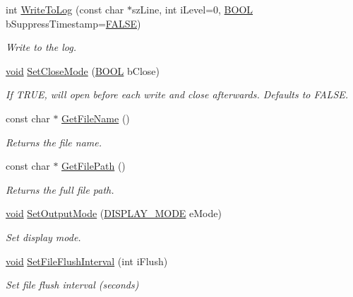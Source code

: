 \begin{DoxyCompactItemize}
int \hyperlink{class_c_logging_aba3316d82e49f6a3d60af0bac38602c2}{\-Write\-To\-Log} (const char $\ast$sz\-Line, int i\-Level=0, \hyperlink{_cpclient_8h_a3be13892ae7076009afcf121347dd319}{\-B\-O\-O\-L} b\-Suppress\-Timestamp=\hyperlink{_x_plat_8h_aa93f0eb578d23995850d61f7d61c55c1}{\-F\-A\-L\-S\-E})
\begin{DoxyCompactList}\small\item\em \-Write to the log. \end{DoxyCompactList}\item 
\hyperlink{_cpclient_8h_a6464f7480a0fd0ee170cba12b2c0497f}{void} \hyperlink{class_c_logging_a7d087ba3ca6900db8239ee5709e0d851}{\-Set\-Close\-Mode} (\hyperlink{_cpclient_8h_a3be13892ae7076009afcf121347dd319}{\-B\-O\-O\-L} b\-Close)
\begin{DoxyCompactList}\small\item\em \-If \-T\-R\-U\-E, will open before each write and close afterwards. \-Defaults to \-F\-A\-L\-S\-E. \end{DoxyCompactList}\item 
const char $\ast$ \hyperlink{class_c_logging_a8e563174a6110a658e577365a7499044}{\-Get\-File\-Name} ()
\begin{DoxyCompactList}\small\item\em \-Returns the file name. \end{DoxyCompactList}\item 
const char $\ast$ \hyperlink{class_c_logging_ada42b4f02cf0a7f228bbcc46c436a570}{\-Get\-File\-Path} ()
\begin{DoxyCompactList}\small\item\em \-Returns the full file path. \end{DoxyCompactList}\item 
\hyperlink{_cpclient_8h_a6464f7480a0fd0ee170cba12b2c0497f}{void} \hyperlink{class_c_logging_a5a71a34a3d6e60164458e61c2cb1274d}{\-Set\-Output\-Mode} (\hyperlink{class_c_logging_ac88f172cb4d0a2643a15fe21d4d20910}{\-D\-I\-S\-P\-L\-A\-Y\-\_\-\-M\-O\-D\-E} e\-Mode)
\begin{DoxyCompactList}\small\item\em \-Set display mode. \end{DoxyCompactList}\item 
\hyperlink{_cpclient_8h_a6464f7480a0fd0ee170cba12b2c0497f}{void} \hyperlink{class_c_logging_aa75123089e23934cb00e91d5ea59799a}{\-Set\-File\-Flush\-Interval} (int i\-Flush)
\begin{DoxyCompactList}\small\item\em \-Set file flush interval (seconds) \end{DoxyCompactList}\item 

\end{DoxyCompactItemize}
